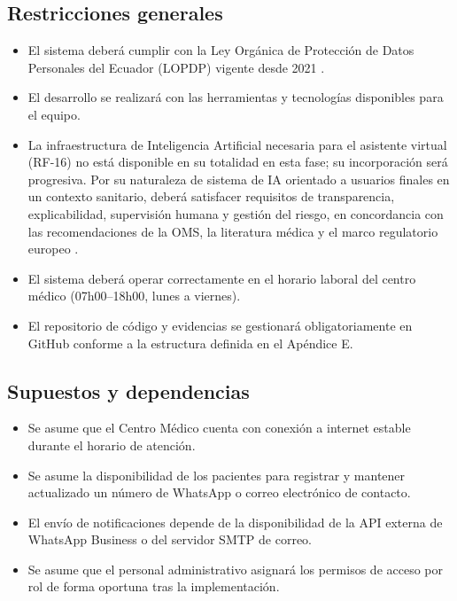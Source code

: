 \documentclass[11pt,a4paper]{article}
\providecommand{\tightlist}{%
	\setlength{\itemsep}{0pt}\setlength{\parskip}{0pt}}
\begin{document}
	\subsection{ Restricciones generales}
	
	\begin{itemize}
		\tightlist
		\item
		El sistema deberá cumplir con la Ley Orgánica de Protección de Datos Personales del Ecuador (LOPDP) vigente desde 2021 \cite{loppd}.
		\item
		El desarrollo se realizará con las herramientas y tecnologías disponibles para el equipo.
		\item
		La infraestructura de Inteligencia Artificial necesaria para el asistente virtual (RF-16) no está disponible en su totalidad en esta fase; su incorporación será progresiva. Por su naturaleza de sistema de IA orientado a usuarios finales en un contexto sanitario, deberá satisfacer requisitos de transparencia, explicabilidad, supervisión humana y gestión del riesgo, en concordancia con las recomendaciones de la OMS, la literatura médica y el marco regulatorio europeo \cite{whoai2021,habiba2024,ahmad2023,euaiact2024}.
		\item
		El sistema deberá operar correctamente en el horario laboral del centro médico (07h00--18h00, lunes a viernes).
		\item
		El repositorio de código y evidencias se gestionará obligatoriamente en GitHub conforme a la estructura definida en el Apéndice E.
	\end{itemize}
	
	\subsection{ Supuestos y dependencias}
	
	\begin{itemize}
		\tightlist
		\item
		Se asume que el Centro Médico cuenta con conexión a internet estable durante el horario de atención.
		\item
		Se asume la disponibilidad de los pacientes para registrar y mantener actualizado un número de WhatsApp o correo electrónico de contacto.
		\item
		El envío de notificaciones depende de la disponibilidad de la API externa de WhatsApp Business o del servidor SMTP de correo.
		\item
		Se asume que el personal administrativo asignará los permisos de acceso por rol de forma oportuna tras la implementación.
	\end{itemize}
	
\end{document}

